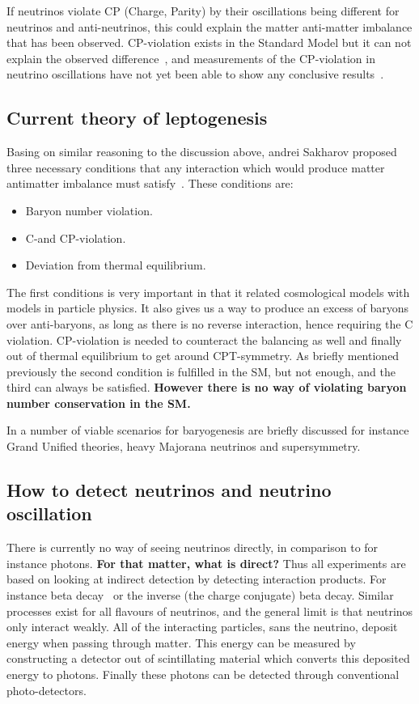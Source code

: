 If neutrinos violate CP (Charge, Parity) by their oscillations being different for neutrinos and anti-neutrinos, this could explain the matter anti-matter imbalance that has been observed. CP-violation exists in the Standard Model but it can not explain the observed difference~\cite{3Peskin}, and measurements of the CP-violation in neutrino oscillations have not yet been able to show any conclusive results~\cite{17Gonzalez}.

\subsection{Current theory of leptogenesis}
Basing on similar reasoning to the discussion above, andrei Sakharov proposed three necessary conditions that any interaction which would produce matter antimatter imbalance must satisfy~\cite{37Sakharov}. These conditions are:
\begin{itemize}
\item Baryon number violation.
\item C-and CP-violation.
\item Deviation from thermal equilibrium.
\end{itemize}

The first conditions is very important in that it related cosmological models with models in particle physics. It also gives us a way to produce an excess of baryons over anti-baryons, as long as there is no reverse interaction, hence requiring the C violation. CP-violation is needed to counteract the balancing as well and finally out of thermal equilibrium to get around CPT-symmetry. As briefly mentioned previously the second condition is fulfilled in the SM, but not enough, and the third can always be satisfied. \textbf{However there is no way of violating baryon number conservation in the SM.}

In \cite{36CRC} a number of viable scenarios for baryogenesis are briefly discussed for instance Grand Unified theories, heavy Majorana neutrinos and supersymmetry.

\subsection{How to detect neutrinos and neutrino oscillation}
There is currently no way of seeing neutrinos directly, in comparison to for instance photons. \textbf{For that matter, what is direct?} Thus all experiments are based on looking at indirect detection by detecting interaction products. For instance beta decay~ or the inverse (the charge conjugate) beta decay. Similar processes exist for all flavours of neutrinos, and the general limit is that neutrinos only interact weakly. All of the interacting particles, sans the neutrino, deposit energy when passing through matter. This energy can be measured by constructing a detector out of scintillating material which converts this deposited energy to photons. Finally these photons can be detected through conventional photo-detectors.

